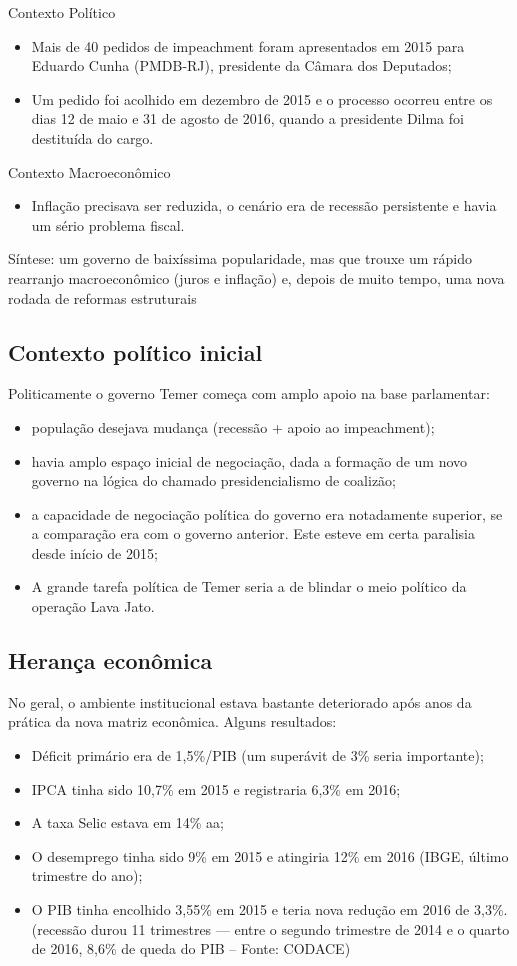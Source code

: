 \documentclass[a4paper,12pt]{article}[abntex2]
\begin{document}
Contexto Político
\begin{itemize}
    \item Mais de 40 pedidos de impeachment foram apresentados em 2015 para Eduardo Cunha (PMDB-RJ), presidente da Câmara dos Deputados;
    \item Um pedido foi acolhido em dezembro de 2015 e o processo ocorreu entre os dias 12 de maio e 31 de agosto de 2016, quando a presidente Dilma foi destituída do cargo.
\end{itemize}

Contexto Macroeconômico
\begin{itemize}
    \item Inflação precisava ser reduzida, o cenário era de recessão persistente e havia um sério problema fiscal.
\end{itemize}

Síntese: um governo de baixíssima popularidade, mas que trouxe um rápido rearranjo macroeconômico (juros e inflação) e, depois de muito tempo, uma nova rodada de reformas estruturais

\subsection{\textbf{Contexto político inicial}}
Politicamente o governo Temer começa com amplo apoio na base parlamentar:
\begin{itemize}
    \item população desejava mudança (recessão + apoio ao impeachment);
    \item havia amplo espaço inicial de negociação, dada a formação de um novo governo na lógica do chamado presidencialismo de coalizão;
    \item a capacidade de negociação política do governo era notadamente superior, se a comparação era com o governo anterior. Este esteve em certa paralisia desde início de 2015;
    \item A grande tarefa política de Temer seria a de blindar o meio político da operação Lava Jato.
\end{itemize}

\subsection{\textbf{Herança econômica}}
No geral, o ambiente institucional estava bastante deteriorado após anos da prática da nova matriz econômica. Alguns resultados:
\begin{itemize}
    \item Déficit primário era de 1,5\%/PIB (um superávit de 3\% seria importante);
    \item IPCA tinha sido 10,7\% em 2015 e registraria 6,3\% em 2016;
    \item A taxa Selic estava em 14\% aa;
    \item O desemprego tinha sido 9\% em 2015 e atingiria 12\% em 2016 (IBGE, último trimestre do ano);
    \item O PIB tinha encolhido 3,55\% em 2015 e teria nova redução em 2016 de 3,3\%. (recessão durou 11 trimestres — entre o segundo trimestre de 2014 e o quarto de 2016, 8,6\% de queda do PIB – Fonte: CODACE)
\end{itemize}
\end{document}
